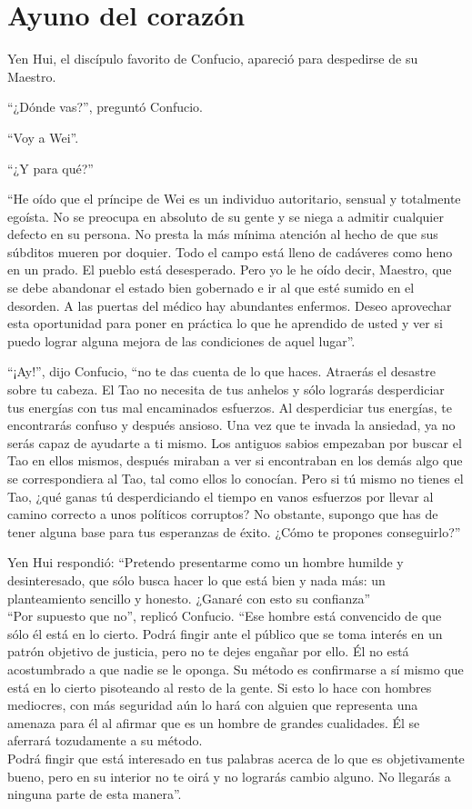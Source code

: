\documentclass[book,b5paper,hidelinks,final]{memoir}
\begin{document}
	\chapter*{Ayuno del corazón}
	
	Yen Hui, el discípulo favorito de Confucio, apareció para despedirse de
	su Maestro.
	
	``¿Dónde vas?'', preguntó Confucio.
	
	``Voy a Wei''.
	
	``¿Y para qué?''
	
	``He oído que el príncipe de Wei es un individuo autoritario, sensual y
	totalmente egoísta. No se preocupa en absoluto de su gente y se niega a
	admitir cualquier defecto en su persona. No presta la más mínima
	atención al hecho de que sus súbditos mueren por doquier. Todo el campo
	está lleno de cadáveres como heno en un prado. El pueblo está
	desesperado. Pero yo le he oído decir, Maestro, que se debe abandonar el
	estado bien gobernado e ir al que esté sumido en el desorden. A las
	puertas del médico hay abundantes enfermos. Deseo aprovechar esta
	oportunidad para poner en práctica lo que he aprendido de usted y ver si
	puedo lograr alguna mejora de las condiciones de aquel lugar''.
	
	``¡Ay!'', dijo Confucio, ``no te das cuenta de lo que haces. Atraerás el
	desastre sobre tu cabeza. El Tao no necesita de tus anhelos y sólo
	lograrás desperdiciar tus energías con tus mal encaminados esfuerzos. Al
	desperdiciar tus energías, te encontrarás confuso y después ansioso. Una
	vez que te invada la ansiedad, ya no serás capaz de ayudarte a ti mismo.
	Los antiguos sabios empezaban por buscar el Tao en ellos mismos, después
	miraban a ver si encontraban en los demás algo que se correspondiera al
	Tao, tal como ellos lo conocían. Pero si tú mismo no tienes el Tao, ¿qué
	ganas tú desperdiciando el tiempo en vanos esfuerzos por llevar al
	camino correcto a unos políticos corruptos? No obstante, supongo que has
	de tener alguna base para tus esperanzas de éxito. ¿Cómo te propones
	conseguirlo?''
	
	Yen Hui respondió: ``Pretendo presentarme como un hombre humilde y
	desinteresado, que sólo busca hacer lo que está bien y nada más: un
	planteamiento sencillo y honesto. ¿Ganaré con esto su confianza''\\
	``Por supuesto que no'', replicó Confucio. ``Ese hombre está convencido
	de que sólo él está en lo cierto. Podrá fingir ante el público que se
	toma interés en un patrón objetivo de justicia, pero no te dejes engañar
	por ello. Él no está acostumbrado a que nadie se le oponga. Su método es
	confirmarse a sí mismo que está en lo cierto pisoteando al resto de la
	gente. Si esto lo hace con hombres mediocres, con más seguridad aún lo
	hará con alguien que representa una amenaza para él al afirmar que es un
	hombre de grandes cualidades. Él se aferrará tozudamente a su método.\\
	Podrá fingir que está interesado en tus palabras acerca de lo que es
	objetivamente bueno, pero en su interior no te oirá y no lograrás cambio
	alguno. No llegarás a ninguna parte de esta manera''.
	
\end{document}
